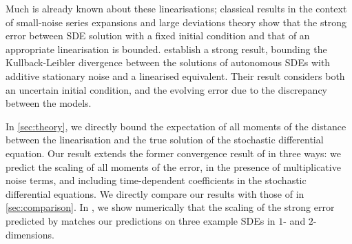 Much is already known about these linearisations; classical results in the context of small-noise series expansions \cite{Blagoveshchenskii_1962_DiffusionProcessesDepending} and large deviations theory \cite{FreidlinWentzell_1998_RandomPerturbationsDynamical} show that the strong error between SDE solution with a fixed initial condition and that of an appropriate linearisation is bounded.
\citet{Sanz-AlonsoStuart_2017_GaussianApproximationsSmall} establish a strong result, bounding the Kullback-Leibler divergence between the solutions of autonomous SDEs with additive stationary noise and a linearised equivalent. Their result considers both an uncertain initial condition, and the evolving error due to the discrepancy between the models.

In \cref{sec:theory}, we directly bound the expectation of all moments of the distance between the linearisation and the true solution of the stochastic differential equation.
Our result extends the former convergence result of \cite{Sanz-AlonsoStuart_2017_GaussianApproximationsSmall} in three ways: we predict the scaling of all moments of the error, in the presence of multiplicative noise terms, and including time-dependent coefficients in the stochastic differential equations. We directly compare our results with those of \cite{Sanz-AlonsoStuart_2017_GaussianApproximationsSmall} in \cref{sec:comparison}.
In , we show numerically that the scaling of the strong error predicted by  matches our predictions on three example SDEs in \(1\)- and \(2\)-dimensions.


